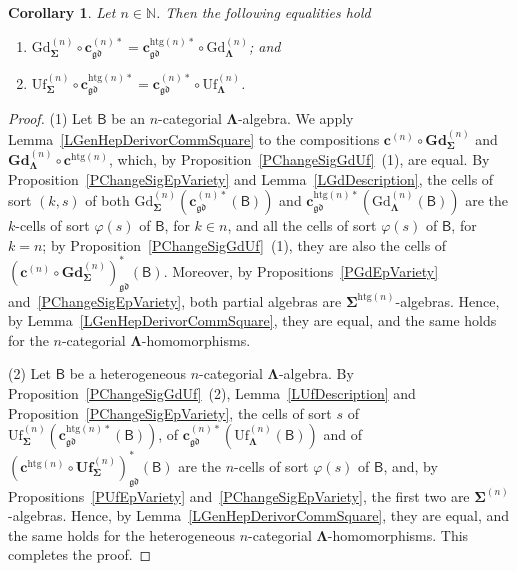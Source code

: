 \documentclass[a4paper, reqno]{amsbook}
\newcommand{\sig}[1]{\mathbf{#1}}             %
\newcommand{\calg}[1]{\boldsymbol{\mathsf{#1}}} %
\newcommand{\gd}{\mathfrak{gd}}              %
\newcommand{\htg}{\mathrm{htg}}                %
\newcommand{\Gd}{\mathrm{Gd}}
\newcommand{\Uf}{\mathrm{Uf}}
\newcommand{\bGd}{\mathbf{Gd}}
\newcommand{\bUf}{\mathbf{Uf}}
\theoremstyle{plain}
\newtheorem{corollary}[theorem]{Corollary}
\theoremstyle{definition}
\begin{document}
\begin{corollary}\label{CChangeSigGdUf}
Let $n\in\mathbb{N}$.
Then the following equalities hold
\begin{enumerate}
	\item
	$\Gd^{(n)}_{\sig{\Sigma}}\circ\mathbf{c}^{(n)\ast}_{\gd}=\mathbf{c}^{\htg(n)\ast}_{\gd}\circ\Gd^{(n)}_{\sig{\Lambda}}$; and

	\item
	$\Uf^{(n)}_{\sig{\Sigma}}\circ\mathbf{c}^{\htg(n)\ast}_{\gd}=\mathbf{c}^{(n)\ast}_{\gd}\circ\Uf^{(n)}_{\sig{\Lambda}}$.
\end{enumerate}
\end{corollary}
\begin{proof}
(1) Let $\calg{B}$ be an $n$-categorial $\sig{\Lambda}$-algebra.
We apply Lemma~\ref{LGenHepDerivorCommSquare} to the compositions $\mathbf{c}^{(n)}\circ\bGd^{(n)}_{\sig{\Sigma}}$ and $\bGd^{(n)}_{\sig{\Lambda}}\circ\mathbf{c}^{\htg(n)}$, which, by Proposition~\ref{PChangeSigGdUf}~(1), are equal.
By Proposition~\ref{PChangeSigEpVariety} and Lemma~\ref{LGdDescription}, the cells of sort $(k,s)$ of both $\Gd^{(n)}_{\sig{\Sigma}}(\mathbf{c}^{(n)\ast}_{\gd}(\calg{B}))$ and $\mathbf{c}^{\htg(n)\ast}_{\gd}(\Gd^{(n)}_{\sig{\Lambda}}(\calg{B}))$ are the $k$-cells of sort $\varphi(s)$ of $\calg{B}$, for $k\in n$, and all the cells of sort $\varphi(s)$ of $\calg{B}$, for $k=n$; by Proposition~\ref{PChangeSigGdUf}~(1), they are also the cells of $(\mathbf{c}^{(n)}\circ\bGd^{(n)}_{\sig{\Sigma}})^{\ast}_{\gd}(\calg{B})$.
Moreover, by Propositions~\ref{PGdEpVariety} and~\ref{PChangeSigEpVariety}, both partial algebras are $\sig{\Sigma}^{\htg(n)}$-algebras.
Hence, by Lemma~\ref{LGenHepDerivorCommSquare}, they are equal, and the same holds for the $n$-categorial $\sig{\Lambda}$-homomorphisms.

(2) Let $\calg{B}$ be a heterogeneous $n$-categorial $\sig{\Lambda}$-algebra.
By Proposition~\ref{PChangeSigGdUf}~(2), Lemma~\ref{LUfDescription} and Proposition~\ref{PChangeSigEpVariety}, the cells of sort $s$ of $\Uf^{(n)}_{\sig{\Sigma}}(\mathbf{c}^{\htg(n)\ast}_{\gd}(\calg{B}))$, of $\mathbf{c}^{(n)\ast}_{\gd}(\Uf^{(n)}_{\sig{\Lambda}}(\calg{B}))$ and of $(\mathbf{c}^{\htg(n)}\circ\bUf^{(n)}_{\sig{\Sigma}})^{\ast}_{\gd}(\calg{B})$ are the $n$-cells of sort $\varphi(s)$ of $\calg{B}$, and, by Propositions~\ref{PUfEpVariety} and~\ref{PChangeSigEpVariety}, the first two are $\sig{\Sigma}^{(n)}$-algebras.
Hence, by Lemma~\ref{LGenHepDerivorCommSquare}, they are equal, and the same holds for the heterogeneous $n$-categorial $\sig{\Lambda}$-homomorphisms. This completes the proof.
\end{proof}
\end{document}
